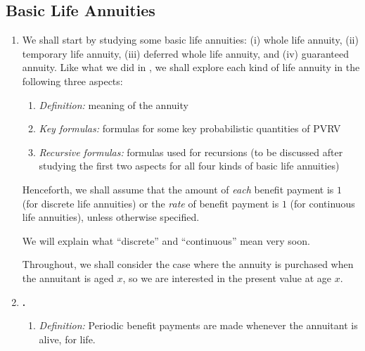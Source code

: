\subsection{Basic Life Annuities}
\label{subsect:basic-annuity}
\begin{enumerate}
\item We shall start by studying some basic life annuities: (i) whole life
annuity, (ii) temporary life annuity, (iii) deferred whole life annuity, and
(iv) guaranteed annuity. Like what we did in , we
shall explore each kind of life annuity in the following three aspects:
\begin{enumerate}[label={(\arabic*)}]
\item \emph{Definition:} meaning of the annuity
\item \emph{Key formulas:} formulas for some key probabilistic quantities of PVRV
\item \emph{Recursive formulas:} formulas used for recursions (to be discussed
after studying the first two aspects for all four kinds of basic life annuities)
\end{enumerate}
Henceforth, we shall assume that the amount of \emph{each} benefit payment is
\(1\) (for discrete life annuities) or the \emph{rate} of benefit
payment is \(1\) (for continuous life annuities), unless otherwise
specified. \begin{note}
We will explain what ``discrete'' and ``continuous'' mean very soon.
\end{note}

Throughout, we shall consider the case where the annuity is purchased when the
annuitant is aged \(x\), so we are interested in the present value at age
\(x\).
\item \textbf{.}
\begin{enumerate}[label={(\arabic*)}]
\item \emph{Definition:} Periodic benefit payments are made whenever the annuitant is
alive, for life.


\end{enumerate}
\end{enumerate}

